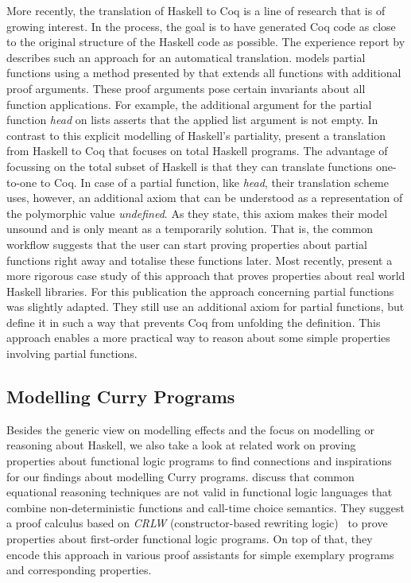 More recently, the translation of Haskell to Coq is a line of research that is of growing interest.
In the process, the goal is to have generated Coq code as close to the original structure of the Haskell code as possible.
The experience report by \citet{dijkstra2012experimentation} describes such an approach for an automatical translation.
\citeauthor{dijkstra2012experimentation} models partial functions using a method presented by \citet{bove2007computation} that extends all functions with additional proof arguments.
These proof arguments pose certain invariants about all function applications.
For example, the additional argument for the partial function \emph{head} on lists asserts that the applied list argument is not empty.
In contrast to this explicit modelling of Haskell's partiality, \citet{spector-zabusky2018total} present a translation from Haskell to Coq that focuses on total Haskell programs.
The advantage of focussing on the total subset of Haskell is that they can translate functions one\--to\--one to Coq.
In case of a partial function, like \emph{head}, their translation scheme uses, however, an additional axiom that can be understood as a representation of the polymorphic value \emph{undefined}.
As they state, this axiom makes their model unsound and is only meant as a temporarily solution.
That is, the common workflow suggests that the user can start proving properties about partial functions right away and totalise these functions later.
Most recently, \citet{breitner2018ready} present a more rigorous case study of this approach that proves properties about real world Haskell libraries.
For this publication the approach concerning partial functions was slightly adapted.
They still use an additional axiom for partial functions, but define it in such a way that prevents Coq from unfolding the definition.
This approach enables a more practical way to reason about some simple properties involving partial functions.

\subsection{Modelling Curry Programs}

Besides the generic view on modelling effects and the focus on modelling or reasoning about Haskell, we also take a look at related work on proving properties about functional logic programs to find connections and inspirations for our findings about modelling Curry programs.
\citet{cleva2004logic} discuss that common equational reasoning techniques are not valid in functional logic languages that combine non\--deterministic functions and call\--time choice semantics.
They suggest a proof calculus based on \emph{CRLW} (constructor\--based rewriting logic)~\citep{gonzalez-moreno1996rewriting} to prove properties about first\--order functional logic programs.
On top of that, they encode this approach in various proof assistants for simple exemplary programs and corresponding properties.

